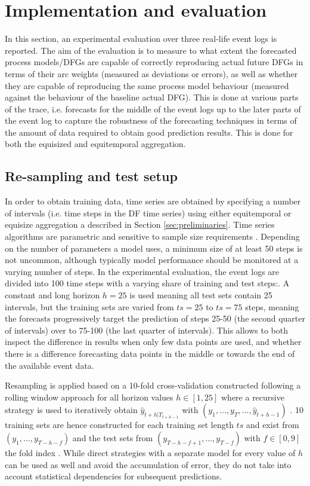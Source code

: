 \section{Implementation and evaluation}\label{sec:experiment}
In this section, an experimental evaluation over three real-life event logs is reported.
The aim of the evaluation is to measure to what extent the forecasted process models/DFGs are capable of correctly reproducing actual future DFGs in terms of their arc weights (measured as deviations or errors), as well as whether they are capable of reproducing the same process model behaviour (measured against the behaviour of the baseline actual DFG).
This is done at various parts of the trace, i.e. forecasts for the middle of the event logs up to the later parts of the event log to capture the robustness of the forecasting techniques in terms of the amount of data required to obtain good prediction results.
This is done for both the equisized and equitemporal aggregation.

\subsection{Re-sampling and test setup}
In order to obtain training data, time series are obtained by specifying a number of intervals (i.e. time steps in the DF time series) using either equitemporal or equisize aggregation a described in Section \ref{sec:preliminaries}.
Time series algorithms are parametric and sensitive to sample size requirements \cite{hanke2001business}.
Depending on the number of parameters a model uses, a minimum size of at least 50 steps is not uncommon, although typically model performance should be monitored at a varying number of steps.
In the experimental evaluation, the event logs are divided into 100 time steps with a varying share of training and test steps:. A constant and long horizon $h=25$ is used meaning all test sets contain 25 intervals, but the training sets are varied from $ts=25$ to $ts=75$ steps, meaning the forecasts progressively target the prediction of steps 25-50 (the second quarter of intervals) over to 75-100 (the last quarter of intervals).
This allows to both inspect the difference in results when only few data points are used, and whether there is a difference forecasting data points in the middle or towards the end of the available event data.

Resampling is applied based on a 10-fold cross-validation constructed following a rolling window approach for all horizon values $h\in[1,25]$ where a recursive strategy is used to iteratively obtain $\hat{y}_{t+h|T_{t+h-1}}$ with $(y_1,\dots,y_{T},\dots,\hat{y}_{t+h-1})$ \cite{weigend2018time}.
10 training sets are hence constructed for each training set length $ts$ and exist from $(y_1,\dots,y_{T-h-f})$ and the test sets from $(y_{T-h-f+1},\dots,y_{T-f})$ with $f\in[0,9]$ the fold index \cite{bergmeir2012use}.
While direct strategies with a separate model for every value of $h$ can be used as well and avoid the accumulation of error, they do not take into account statistical dependencies for subsequent predictions.

